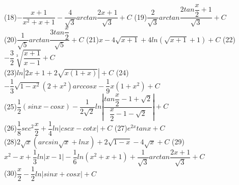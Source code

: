 \documentclass[UTF8]{ctexart}
\begin{document}
   (18)$-\dfrac{x+1}{x^2+x+1}-\dfrac{4}{\sqrt{3}}arctan\dfrac{2x+1}{\sqrt{3}}+C$\quad\quad\quad
   (19)$\dfrac{2}{\sqrt{3}}arctan\dfrac{2tan\dfrac{x}{2}+1}{\sqrt{3}}+C$
   \\
   (20)$\dfrac{1}{\sqrt{5}}arctan\dfrac{3tan\dfrac{x}{2}}{\sqrt{5}}+C$\quad\quad\quad
   (21)$x-4\sqrt{x+1}+4ln(\sqrt{x+1}+1)+C$\quad\quad\quad
   (22)$-\dfrac{3}{2}\sqrt[3]{\dfrac{x+1}{x-1}}+C$
   \\
   (23)$ln|2x+1+2\sqrt{x(1+x)}|+C$\quad\quad\quad
   (24)$-\dfrac{1}{3}\sqrt{1-x^2}(2+x^2)arccosx-\dfrac{1}{9}x(1+x^2)+C$
   \\
   (25)$\dfrac{1}{2}(sinx-cosx)-\dfrac{1}{2\sqrt{2}}ln\left|\dfrac{tan\dfrac{x}{2}-1+\sqrt{2}}{\dfrac{x}{2}-1-\sqrt{2}}\right|+C$
   \\
   (26)$\dfrac{1}{8}sec^2\dfrac{x}{2}+\dfrac{1}{4}ln|cscx-cotx|+C$\quad\quad\quad
   (27)$e^{2x}tanx+C$
   \\
   (28)$2\sqrt{x}(arcsin\sqrt{x}+lnx)+2\sqrt{1-x}-4\sqrt{x}+C$\quad\quad\quad
   (29)$x^2-x+\dfrac{1}{3}ln|x-1|-\dfrac{1}{6}ln(x^2+x+1)+\dfrac{1}{\sqrt{3}}arctan\dfrac{2x+1}{\sqrt{3}}+C$
   \\
   (30)$\dfrac{x}{2}-\dfrac{1}{2}ln|sinx+cosx|+C$
     
\end{document}
